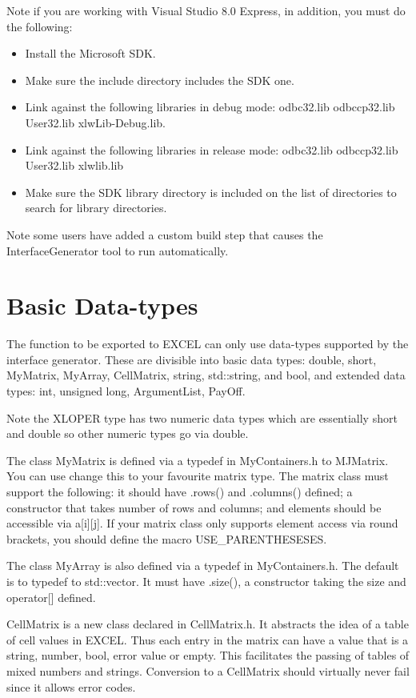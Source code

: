 \documentclass[12pt,reqno]{amsart}
\numberwithin{equation}{section}
\numberwithin{figure}{section}
\begin{document}
Note if you are working with Visual Studio 8.0 Express, in addition, you must do
the following:   
\begin{itemize}
\item Install the Microsoft SDK.
\item Make sure the include directory includes the SDK one.
\item Link against the following libraries in debug mode: odbc32.lib
  odbccp32.lib User32.lib xlwLib-Debug.lib.
\item Link against the following libraries in release mode: odbc32.lib 
odbccp32.lib User32.lib xlwlib.lib
\item Make sure the SDK library directory is included on the list of
  directories to search for library directories. 
\end{itemize}

Note some users have added a custom build step that causes the
InterfaceGenerator tool to run automatically. 

\section{Basic Data-types}

The function to be exported to EXCEL can only use data-types supported
by the interface generator. These are divisible into basic data types: 
double, short,
MyMatrix, MyArray, CellMatrix, string, std::string, and bool, and
extended data types: int, unsigned long, ArgumentList, PayOff. 

Note the XLOPER type has two numeric data types which are essentially
short and double so other numeric types go via double. 

The class MyMatrix is defined via a typedef in MyContainers.h to
MJMatrix. You can use change this to your favourite matrix type. The
matrix class must support the following: it should have .rows()
and .columns() defined; a constructor that takes number of rows and
columns; and elements should be accessible via a[i][j]. If your matrix
class only supports element access via round brackets, you should
define the macro USE_PARENTHESESES.

The class MyArray is also defined via a typedef in MyContainers.h. The
default is to typedef to std::vector. It must have .size(), a
constructor taking the size and operator[] defined. 

CellMatrix is a new class declared in CellMatrix.h. It abstracts the
idea of a table of cell values in EXCEL. Thus each entry in the matrix
can have a value that is a string, number, bool, error value or
empty. This facilitates the passing of tables of mixed numbers and
strings. Conversion to a CellMatrix should virtually never fail since
it allows error codes. 
\end{document}

